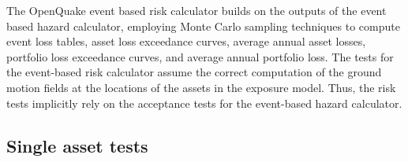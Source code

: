 The OpenQuake event based risk calculator builds on the outputs of the event based hazard calculator, employing Monte Carlo sampling techniques to compute event loss tables, asset loss exceedance curves, average annual asset losses, portfolio loss exceedance curves, and average annual portfolio loss. The tests for the event-based risk calculator assume the correct computation of the ground motion fields at the locations of the assets in the exposure model. Thus, the risk tests implicitly rely on the acceptance tests for the event-based hazard calculator.

\subsection{Single asset tests}
\label{subsec:acc-ebr-single}


% 

% 

% 
